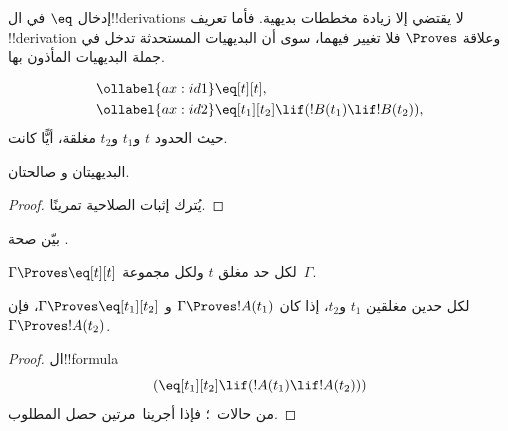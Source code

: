 \documentclass[../../../include/open-logic-section]{subfiles}
\begin{document}


إدخال $\eq$ في ال!!{derivation}s لا يقتضي إلا زيادة مخططات بديهية.
فأما تعريف !!{derivation} وعلاقة $\Proves$ فلا تغيير فيهما، سوى أن
البديهيات المستحدثة تدخل في جملة البديهيات المأذون بها.

\begin{defn}
\begin{align}
\ollabel{ax:id1} & \eq[t][t], \\
\ollabel{ax:id2} & \eq[t_1][t_2] \lif (!B(t_1) \lif
  !B(t_2)),
\end{align}
حيث الحدود $t$ و$t_1$ و$t_2$ مغلقة، أيًّا كانت.
\end{defn}

\begin{prop}
  البديهيتان  و صالحتان.
\end{prop}

\begin{proof}
  يُترك إثبات الصلاحية تمرينًا.
\end{proof}

\begin{prob}
بيّن صحة .
\end{prob}

\begin{prop}
 $\Gamma \Proves \eq[t][t]$ لكل حد مغلق $t$ ولكل مجموعة~$\Gamma$.
\end{prop}

\begin{prop}
  لكل حدين مغلقين $t_1$ و$t_2$، إذا كان $\Gamma \Proves !A(t_1)$ و
  $\Gamma \Proves \eq[t_1][t_2]$، فإن $\Gamma \Proves !A(t_2)$.
\end{prop}

\begin{proof}
ال!!{formula}
\[
(\eq[t_1][t_2] \lif (!A(t_1) \lif !A(t_2)))
\]
من حالات~؛ فإذا أجرينا~\MP مرتين حصل المطلوب.
\end{proof}
\end{document}
